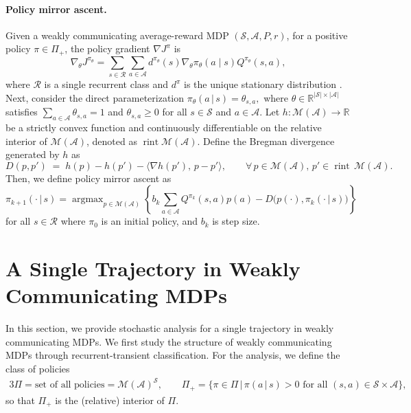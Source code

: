 \documentclass{article}
\theoremstyle{definition}
\theoremstyle{remark}
\DeclareMathOperator*{\argmax}{argmax}
\newcommand{\real}{\mathbb{R}}
\newcommand{\cA}{\mathcal{A}}
\newcommand{\cS}{\mathcal{S}}
\newcommand{\cM}{\mathcal{M}}
\newcommand{\cR}{\mathcal{R}}
\newcommand{\cX}{\mathcal{X}}
\DeclareMathOperator{\rint}{rint}
\begin{document}
\paragraph{Policy mirror ascent.}
Given a weakly communicating average-reward MDP $(\cS, \cA, P, r)$, for a positive policy $\pi\in \Pi_+$, the policy gradient $\nabla J^\pi$ is
\[\nabla_{\theta}  J^{\pi_\theta} =    \sum_{s \in \cR}
\sum_{a \in \cA}
d^{\pi_\theta}(s) \nabla_{\theta} \pi_{\theta} (a \mid s) Q^{\pi_\theta}(s,a), \]
where $\cR$ is a single recurrent class and $d^{\pi}$ is the unique stationary distribution \cite{lee2025multi}.
Next, consider the direct parameterization $\pi_{\theta} (a \,|\, s) = \theta_{s,a},$ where $\theta \in \real^{|\cS|\times |\cA|}$ satisfies $\sum_{a \in \cA} \theta_{s,a}=1$ and $\theta_{s,a}\ge 0$ for all $s\in \cS$ and $a\in \cA$. 
Let \(h:\cM(\cA)\to\mathbb{R}\) be a strictly convex function and continuously
differentiable on the relative interior of \(\cM(\cA)\), denoted as
\(\rint\cM(\cA)\).
Define the Bregman divergence generated by \(h\) as
\[
D(p,p') \;=\; h(p)-h(p')-\langle \nabla h(p'),\, p-p' \rangle,
\qquad\forall\,p\in\cM(\cA),\,p'\in\rint\,\cM(\cA).
\]
Then, we define policy mirror ascent as 
\[\pi_{k+1}(\cdot \,|\, s)=
 \argmax_{p\in \cM (\cA)}
 \left\{
 b_k \sum_{a \in \cA}Q^{\pi_k}(s,a)p(a)
 - D\big(p(\cdot),\pi_{k}(\cdot \,|\, s)\big)\right\}\]
for all $s\in \cR$ where $\pi_0$ is an initial policy, and $b_k$ is step size.
 
\section{A Single Trajectory in Weakly Communicating MDPs}\label{sec:sin}

In this section, we provide stochastic analysis for a single trajectory in weakly communicating MDPs. We first study the structure of weakly communicating MDPs through recurrent-transient classification. For the analysis, we define the class of policies
\begin{alignat*}{3}
\Pi = \text{set of all policies}=\cM(\cA)^\cS, \qquad \Pi_{+} = \{ \pi\in \Pi \,|\, \pi (a \,|\, s) >0 \text{ for all } (s,a) \in \cS\times \cA\},
\end{alignat*}
so that $\Pi_+$ is the (relative) interior of $\Pi$. 
\end{document}

